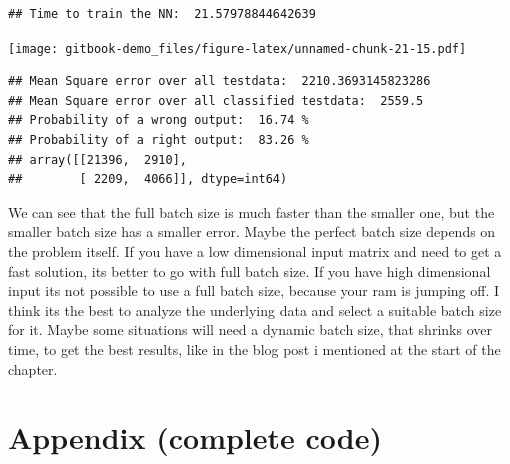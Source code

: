 \documentclass[
]{book}
\begin{document}
\begin{verbatim}
## Time to train the NN:  21.57978844642639
\end{verbatim}

\texttt{[image: gitbook-demo\_files/figure-latex/unnamed-chunk-21-15.pdf]}

\begin{verbatim}
## Mean Square error over all testdata:  2210.3693145823286
## Mean Square error over all classified testdata:  2559.5
## Probability of a wrong output:  16.74 %
## Probability of a right output:  83.26 %
## array([[21396,  2910],
##        [ 2209,  4066]], dtype=int64)
\end{verbatim}

We can see that the full batch size is much faster than the smaller one, but the smaller batch size has a smaller error. Maybe the perfect batch size depends on the problem itself. If you have a low dimensional input matrix and need to get a fast solution, its better to go with full batch size. If you have high dimensional input its not possible to use a full batch size, because your ram is jumping off. I think its the best to analyze the underlying data and select a suitable batch size for it. Maybe some situations will need a dynamic batch size, that shrinks over time, to get the best results, like in the blog post i mentioned at the start of the chapter.

\hypertarget{appendix-complete-code-4}{%
\section{Appendix (complete code)}\label{appendix-complete-code-4}}
\end{document}
